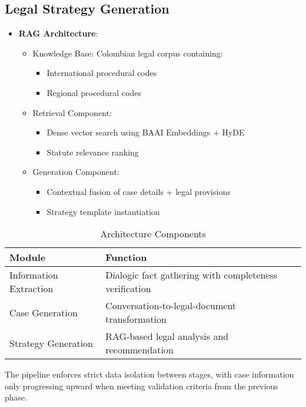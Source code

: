 \subsection{Legal Strategy Generation}
\begin{itemize}
    \item \textbf{RAG Architecture}:
    \begin{itemize}
        \item Knowledge Base: Colombian legal corpus containing:
        \begin{itemize}
            \item International procedural codes
            \item Regional procedural codes
        \end{itemize}
        
        \item Retrieval Component:
        \begin{itemize}
            \item Dense vector search using BAAI Embeddings + HyDE
            \item Statute relevance ranking
        \end{itemize}
        
        \item Generation Component:
        \begin{itemize}
            \item Contextual fusion of case details + legal provisions
            \item Strategy template instantiation
        \end{itemize}
    \end{itemize}
\end{itemize}

\begin{table}[h]
    \centering
    \caption{Architecture Components}
    \label{tab:components}
    \begin{tabular}{lp{}}
        \toprule
        \textbf{Module} & \textbf{Function} \\
        \midrule
        Information Extraction & Dialogic fact gathering with completeness verification \\
        Case Generation & Conversation-to-legal-document transformation \\
        Strategy Generation & RAG-based legal analysis and recommendation \\
        \bottomrule
    \end{tabular}
\end{table}

The pipeline enforces strict data isolation between stages, 
with case information only progressing upward when meeting 
validation criteria from the previous phase.
